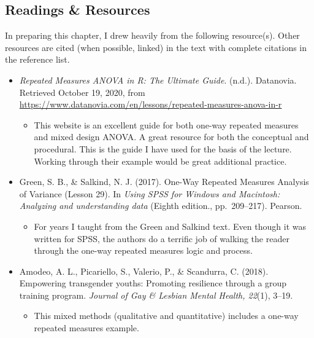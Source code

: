 \documentclass[
  11pt,
]{book}
\providecommand{\tightlist}{%
  \setlength{\itemsep}{0pt}\setlength{\parskip}{0pt}}
\begin{document}
\hypertarget{readings-resources-6}{%
\subsection{Readings \& Resources}\label{readings-resources-6}}

In preparing this chapter, I drew heavily from the following resource(s). Other resources are cited (when possible, linked) in the text with complete citations in the reference list.

\begin{itemize}
\tightlist
\item
  \emph{Repeated Measures ANOVA in R: The Ultimate Guide}. (n.d.). Datanovia. Retrieved October 19, 2020, from \url{https://www.datanovia.com/en/lessons/repeated-measures-anova-in-r}

  \begin{itemize}
  \tightlist
  \item
    This website is an excellent guide for both one-way repeated measures and mixed design ANOVA. A great resource for both the conceptual and procedural. This is the guide I have used for the basis of the lecture. Working through their example would be great additional practice.
  \end{itemize}
\item
  Green, S. B., \& Salkind, N. J. (2017). One-Way Repeated Measures Analysis of Variance (Lesson 29). In \emph{Using SPSS for Windows and Macintosh: Analyzing and understanding data} (Eighth edition., pp.~209--217). Pearson.

  \begin{itemize}
  \tightlist
  \item
    For years I taught from the Green and Salkind text. Even though it was written for SPSS, the authors do a terrific job of walking the reader through the one-way repeated measures logic and process.
  \end{itemize}
\item
  Amodeo, A. L., Picariello, S., Valerio, P., \& Scandurra, C. (2018). Empowering transgender youths: Promoting resilience through a group training program. \emph{Journal of Gay \& Lesbian Mental Health, 22}(1), 3--19.

  \begin{itemize}
  \tightlist
  \item
    This mixed methods (qualitative and quantitative) includes a one-way repeated measures example.
  \end{itemize}
\end{itemize}
\end{document}
